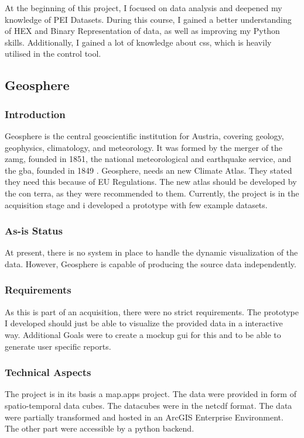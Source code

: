 \documentclass[11pt, titlepage, a4paper]{article}
\begin{document}
At the beginning of this project, I focused on data analysis and deepened my knowledge of PEI Datasets. During this course, I gained a better understanding of HEX and Binary Representation of data, as well as improving my Python skills.  Additionally, I gained a lot of knowledge about \gls{css}, which is heavily utilised in the control tool.%

\subsection{Geosphere}
\subsubsection{Introduction}
Geosphere is the central geoscientific institution for Austria, covering geology, geophysics, climatology, and meteorology.  It was formed by the merger of the \gls{zamg}, founded in 1851, the national meteorological and earthquake service, and the \gls{gba}, founded in 1849 \cite{geosphereHome2024}. 
Geosphere, needs an new Climate Atlas. They stated they need this because of EU Regulations. The new atlas should be developed by the con terra, as they were recommended to them. Currently, the project is in the acquisition stage and i developed a prototype with few example datasets.

\subsubsection{As-is Status}
At present, there is no system in place to handle the dynamic visualization of the data. However, Geosphere is capable of producing the source data independently. 
\subsubsection{Requirements}
As this is part of an acquisition, there were no strict requirements. The prototype I developed should just be able to visualize the provided data in a interactive way. Additional Goals were to create a mockup \gls{gui} for this and to be able to generate user specific reports. 
\subsubsection{Technical Aspects}
The project is in its basis a map.apps project. The data were provided in form of spatio-temporal data cubes. The datacubes were in the \gls{netcdf} format. The data were partially transformed and hosted in an ArcGIS Enterprise Environment. The other part were accessible by a python backend.
\end{document}
